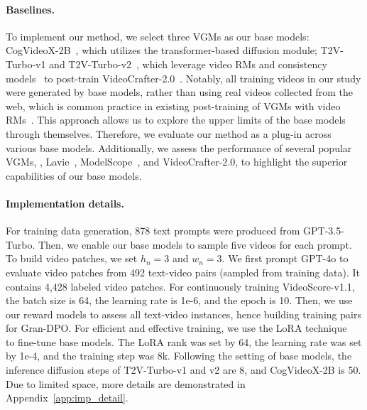 \paragraph{Baselines.} To implement our method, we select three VGMs as our base models: CogVideoX-2B~\cite{CogVideoX}, which utilizes the transformer-based diffusion module; T2V-Turbo-v1 and T2V-Turbo-v2~\cite{t2v-turbo,t2v-turbo-v2}, which leverage video RMs and consistency models~\cite{CM} to post-train VideoCrafter-2.0~\cite{VC2}. Notably, all training videos in our study were generated by base models, rather than using real videos collected from the web, which is common practice in existing post-training of VGMs with video RMs~\cite{t2v-turbo,t2v-turbo-v2}. 
This approach allows us to explore the upper limits of the base models through themselves. Therefore, we evaluate our method as a plug-in across various base models. Additionally, we assess the performance of several popular VGMs, \ie, Lavie~\cite{LAVIE}, ModelScope~\cite{ModelScope}, and VideoCrafter-2.0, to highlight the superior capabilities of our base models. 

\paragraph{Implementation details.} For training data generation, 878 text prompts were produced from GPT-3.5-Turbo. Then, we enable our base models to sample five videos for each prompt. To build video patches, we set $h_n=3$ and $w_n=3$. We first prompt GPT-4o to evaluate video patches from 492 text-video pairs (sampled from training data). It contains 4,428 labeled video patches. For continuously training VideoScore-v1.1, the batch size is 64, the learning rate is 1e-6, and the epoch is 10. Then, we use our reward models to assess all text-video instances, hence building training pairs for Gran-DPO. For efficient and effective training, we use the LoRA technique~\cite{lora} to fine-tune base models. The LoRA rank was set by 64, the learning rate was set by 1e-4, and the training step was 8k. 
Following the setting of base models, the inference diffusion steps of T2V-Turbo-v1 and v2 are 8, and CogVideoX-2B is 50. 
Due to limited space, more details are demonstrated in Appendix~\ref{app:imp_detail}.

